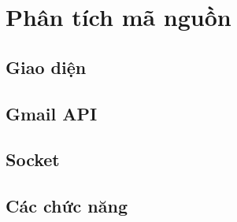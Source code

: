 \section{Phân tích mã nguồn}

\subsection{Giao diện}

\newpage

\subsection{Gmail API}

\newpage

\subsection{Socket}

\newpage

\subsection{Các chức năng}

\newpage